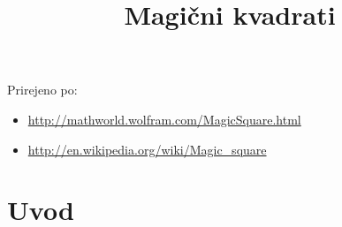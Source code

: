 \documentclass[a4paper,12pt]{article}
\title{Magični kvadrati}
\author{}
\date{ }
\begin{document}
\maketitle

Prirejeno po:

\begin{itemize}
   \item \url{http://mathworld.wolfram.com/MagicSquare.html}
   \item \url{http://en.wikipedia.org/wiki/Magic_square}
\end{itemize}

\tableofcontents

\newpage

\section{Uvod}
\end{document}
